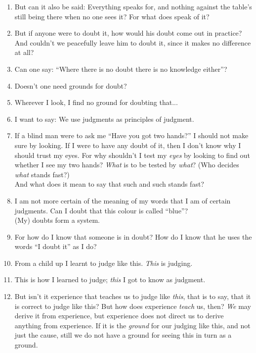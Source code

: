 \documentclass{book}
\begin{document}
\begin{enumerate}
\item
But can it also be said: Everything speaks for, and nothing against the table's
still being there when no one sees it? For what does speak of it?

\item
But if anyone were to doubt it, how would his doubt come out in practice? And
couldn't we peacefully leave him to doubt it, since it makes no difference at
all?

\item
Can one say: ``Where there is no doubt there is no knowledge either''?

\item
Doesn't one need grounds for doubt?

\item
Wherever I look, I find no ground for doubting that...

\item
I want to say: We use judgments as principles of judgment.

\item
If a blind man were to ask me ``Have you got two hands?'' I should not make
sure by looking. If I were to have any doubt of it, then I don't know why I
should trust my eyes. For why shouldn't I test my \emph{eyes} by looking to
find out whether I see my two hands? \emph{What} is to be tested by
\emph{what}? (Who decides \emph{what} stands fast?) \\
And what does it mean to say that such and such stands fast?

\item
I am not more certain of the meaning of my words that I am of certain
judgments. Can I doubt that this colour is called ``blue''? \\
(My) doubts form a system.

\item
For how do I know that someone is in doubt? How do I know that he uses the
words ``I doubt it'' as I do?

\item
From a child up I learnt to judge like this. \emph{This} is judging.

\item
This is how I learned to judge; \emph{this} I got to know as judgment.

\item
But isn't it experience that teaches us to judge like \emph{this}, that is to
say, that it is correct to judge like this? But how does experience
\emph{teach} us, then?  \emph{We} may derive it from experience, but experience
does not direct us to derive anything from experience. If it is the
\emph{ground} for our judging like this, and not just the cause, still we do
not have a ground for seeing this in turn as a ground.


\end{enumerate}
\end{document}
